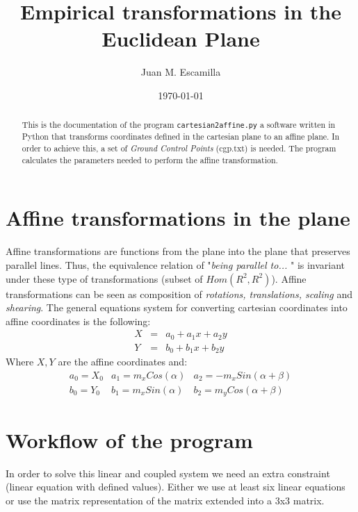 \documentclass[12pt]{article}
\title{Empirical transformations in the Euclidean Plane}
\author{ Juan M. Escamilla}
\date{\today}
\numberwithin{equation}{subsection}
\begin{document}
\maketitle

\begin{abstract}
This is the documentation of the program {\tt cartesian2affine.py} a software written in Python that transforms coordinates defined in the cartesian plane to an affine plane. In order to achieve this, a set of {\em Ground Control Points} (cgp.txt) is needed. The program calculates the parameters needed to perform the affine transformation. 
\end{abstract}

\section{Affine transformations in the plane}
Affine transformations are functions from the plane into the plane that preserves parallel lines. Thus, the equivalence relation of "{\em being parallel to... }" is invariant under these type of transformations (subset of {\bf $Hom(R^2,R^2)$}). Affine transformations can be seen as composition of {\em rotations, translations, scaling} and {\em shearing}. The general equations system for converting cartesian coordinates into affine coordinates is the following:
\begin{equation}\label{eq1}
\begin{array}{lcl}
X & = & a_0 + a_1x + a_2y \\
Y  & = & b_0 + b_1x + b_2y 
\end{array}
\end{equation}
Where $X,Y$ are the affine coordinates and: 
\begin{equation}\label{eq2}
\begin{array}{ccc}
a_0 = X_0 & a_1 = m_{x} Cos(\alpha) & a_2 = -m_{x}Sin(\alpha + \beta) \\
b_0 = Y_0 & b_1 = m_{x}Sin(\alpha) & b_2 = m_{y}Cos(\alpha + \beta)
\end{array}
\end{equation}
\section{Workflow of the program}
In order to solve this linear and coupled system we need an extra constraint (linear equation with defined values).
Either we use at least six linear equations or use the matrix representation of the matrix extended into a 3x3 matrix. 
\end{document}
